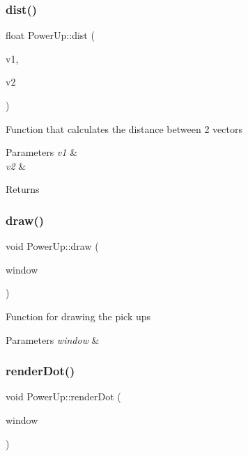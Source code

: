 \subsubsection{\texorpdfstring{dist()}{dist()}}
{\footnotesize\ttfamily float Power\+Up\+::dist (\begin{DoxyParamCaption}\item[{sf\+::\+Vector2f}]{v1,  }\item[{sf\+::\+Vector2f}]{v2 }\end{DoxyParamCaption})\hspace{0.3cm}{\ttfamily [private]}}



Function that calculates the distance between 2 vectors 


\begin{DoxyParams}{Parameters}
{\em v1} & \\
\hline
{\em v2} & \\
\hline
\end{DoxyParams}
\begin{DoxyReturn}{Returns}

\end{DoxyReturn}
\mbox{\label{class_power_up_a79c505ad6dbc8aedeadb7e77a2302503}} 
\subsubsection{\texorpdfstring{draw()}{draw()}}
{\footnotesize\ttfamily void Power\+Up\+::draw (\begin{DoxyParamCaption}\item[{sf\+::\+Render\+Window \&}]{window }\end{DoxyParamCaption})}



Function for drawing the pick ups 


\begin{DoxyParams}{Parameters}
{\em window} & \\
\hline
\end{DoxyParams}
\mbox{\label{class_power_up_ade426f76b11c172d9f9ec7c600f45d7c}} 
\subsubsection{\texorpdfstring{renderDot()}{renderDot()}}
{\footnotesize\ttfamily void Power\+Up\+::render\+Dot (\begin{DoxyParamCaption}\item[{sf\+::\+Render\+Window \&}]{window }\end{DoxyParamCaption})}



